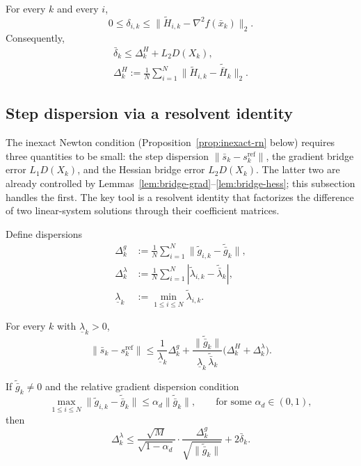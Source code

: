 \documentclass[review,onefignum,onetabnum]{siamart171218}
\begin{document}
	\begin{lemma}\label{lem:delta_control}
		For every $k$ and every $i$,
		\[
		0\le \delta_{i,k}\le \big\|\tilde H_{i,k}-\nabla^2 f(\bar x_k)\big\|_2.
		\]
		Consequently,
		\begin{gather*}
			\bar\delta_k\le \Delta_k^H + L_2D(X_k),\\
			\Delta_k^H:=\tfrac1N\!\sum_{i=1}^N\big\|\tilde H_{i,k}-\tilde{\bar H}_k\big\|_2 .
		\end{gather*}
	\end{lemma}
	
	\subsection{Step dispersion via a resolvent identity}\label{ssec:stepdisp}
	The inexact Newton condition (Proposition~\ref{prop:inexact-rn} below)
	requires three quantities to be small: the step dispersion
	$\|\bar s_k - s_k^{\mathrm{ref}}\|$, the gradient bridge error
	$L_1 D(X_k)$, and the Hessian bridge error $L_2 D(X_k)$.
	The latter two are already controlled by
	Lemmas~\ref{lem:bridge-grad}--\ref{lem:bridge-hess};
	this subsection handles the first.
	The key tool is a resolvent identity that factorizes the
	difference of two linear-system solutions through their
	coefficient matrices.
	
	Define dispersions
	\begin{align*}
		\Delta_k^g&:=\tfrac1N\textstyle\sum_{i=1}^N \|\tilde g_{i,k}-\tilde{\bar g}_k\|,\\
		\Delta_k^\lambda&:=\tfrac1N\textstyle\sum_{i=1}^N |\tilde\lambda_{i,k}-\tilde{\bar\lambda}_k|,\\
		\underline\lambda_k&:=\min_{1\le i\le N}\tilde\lambda_{i,k}.
	\end{align*}
	
	\begin{lemma}\label{lem:step-disp}
		For every $k$ with $\underline\lambda_k>0$,
		\[
		\|\bar s_k-s_k^{\mathrm{ref}}\|
		\le \frac{1}{\underline\lambda_k}\Delta_k^g
		+\frac{\|\tilde{\bar g}_k\|}{\underline\lambda_k\,\tilde{\bar\lambda}_k}\big(\Delta_k^H+\Delta_k^\lambda\big).
		\]
	\end{lemma}
	
	\begin{lemma}\label{lem:lambda_dispersion}
		If $\tilde{\bar g}_k\neq 0$ and the relative gradient dispersion condition
		\begin{equation}\label{eq:rel_grad_disp}
			\max_{1\le i\le N}\|\tilde g_{i,k}-\tilde{\bar g}_k\|\le \alpha_d\|\tilde{\bar g}_k\|,
			\qquad\text{for some }\alpha_d\in(0,1),
		\end{equation}
		then
		\begin{equation}\label{eq:lambda_disp_bound}
			\Delta_k^\lambda
			\le
			\frac{\sqrt{M}}{\sqrt{1-\alpha_d}}\cdot\frac{\Delta_k^g}{\sqrt{\|\tilde{\bar g}_k\|}}
			+2\bar\delta_k.
		\end{equation}
	\end{lemma}
	
\end{document}
